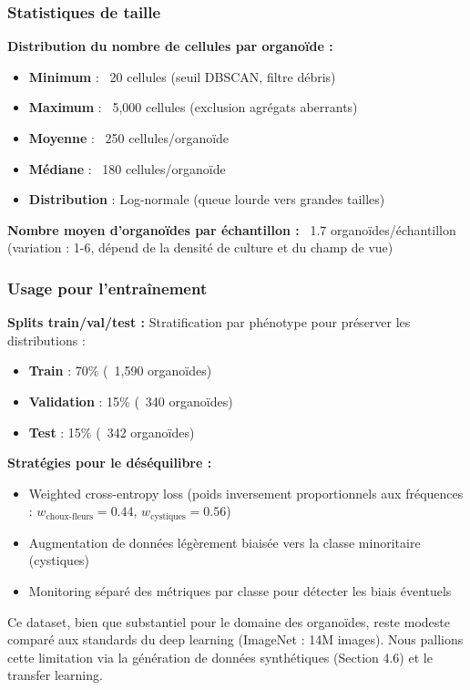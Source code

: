 \subsubsection{Statistiques de taille}

\textbf{Distribution du nombre de cellules par organoïde :}
\begin{itemize}
    \item \textbf{Minimum} : ~20 cellules (seuil DBSCAN, filtre débris)
    \item \textbf{Maximum} : ~5,000 cellules (exclusion agrégats aberrants)
    \item \textbf{Moyenne} : ~250 cellules/organoïde
    \item \textbf{Médiane} : ~180 cellules/organoïde
    \item \textbf{Distribution} : Log-normale (queue lourde vers grandes tailles)
\end{itemize}

\textbf{Nombre moyen d'organoïdes par échantillon :}
~1.7 organoïdes/échantillon (variation : 1-6, dépend de la densité de culture et du champ de vue)

\subsubsection{Usage pour l'entraînement}

\textbf{Splits train/val/test :}
Stratification par phénotype pour préserver les distributions :
\begin{itemize}
    \item \textbf{Train} : 70\% (~1,590 organoïdes)
    \item \textbf{Validation} : 15\% (~340 organoïdes)
    \item \textbf{Test} : 15\% (~342 organoïdes)
\end{itemize}

\textbf{Stratégies pour le déséquilibre :}
\begin{itemize}
    \item Weighted cross-entropy loss (poids inversement proportionnels aux fréquences : $w_{\text{choux-fleurs}} = 0.44$, $w_{\text{cystiques}} = 0.56$)
    \item Augmentation de données légèrement biaisée vers la classe minoritaire (cystiques)
    \item Monitoring séparé des métriques par classe pour détecter les biais éventuels
\end{itemize}

Ce dataset, bien que substantiel pour le domaine des organoïdes, reste modeste comparé aux standards du deep learning (ImageNet : 14M images). Nous pallions cette limitation via la génération de données synthétiques (Section 4.6) et le transfer learning.

